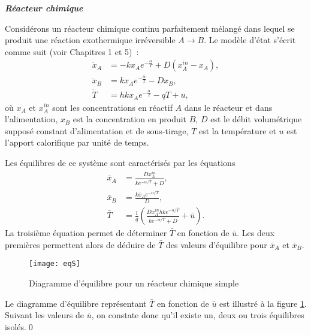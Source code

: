 \begin{exemple}{\bf{\em R\'eacteur chimique}}

Consid\'erons un r\'eacteur chimique continu parfaitement m\'elang\'e dans lequel se produit une
r\'eaction exothermique irr\'eversible $A \longrightarrow B$. Le mod\`ele d'\'etat s'\'ecrit comme suit (voir Chapitres 1 et 5)~:
\begin{equation*} \begin{split} 
\dot x_A &= -kx_A e^{-\frac{\alpha}{T}}+D(x_A^{in}-x_{A}),\\
\dot x_{B} &= kx_{A} e^{-\frac{\alpha}{T}}-D x_{B},\\
\dot T &= hkx_{A} e^{-\frac{\alpha}{T}}-qT+u,
\end{split} \end{equation*}
où $x_{A}$ et $x_{A}^{in}$ sont les concentrations en r\'eactif $A$
dans le r\'eacteur et dans l'alimentation, $x_B$ est la concentration en produit $B$, $D$ est le d\'ebit volum\'etrique suppos\'e constant d'alimentation et de sous-tirage,
$T$ est la temp\'erature et $u$ est l'apport calorifique par unit\'e
de temps.

Les \'equilibres de ce syst\`eme sont caract\'eris\'es par les
\'equations
\begin{equation*} \begin{split}
\bar x_{A}&=\frac{Dx_{A}^{in}}{k e^{-\alpha/\bar T}+D}, \\
\bar x_{B}&=\frac{k \bar x_{A} e^{-\alpha/\bar T}}{D}, \\
\bar T&=\frac{1}{q}\left(\frac{Dx_{A}^{in}hk  e^{-\alpha/\bar T}}{k
 e^{-\alpha/\bar T}+D} + \bar u \right).
\end{split} \end{equation*}
La troisi\`eme \'equation permet de d\'eterminer $\bar T$ en fonction de $\bar u$. Les deux premi\`eres permettent alors de d\'eduire de $\bar T$ des valeurs d'\'equilibre pour $\bar x_{A}$ et $\bar x_{B}$. 
\begin{figure}[h]
\begin{center}
\texttt{[image: eqS]}
\caption{Diagramme d'\'equilibre pour un r\'eacteur chimique simple}
\label{fig:eqS}
\end{center} 
\vspace{-5mm}
\end{figure}
Le diagramme d'\'equilibre repr\'esentant $\bar T$ en fonction de $\bar u$ est
illustr\'e \`a la figure \ref{fig:eqS}.
Suivant les valeurs de $\bar u$, on constate donc qu'il
existe un, deux ou trois
\'equilibres isol\'es.\qed
\end{exemple}

